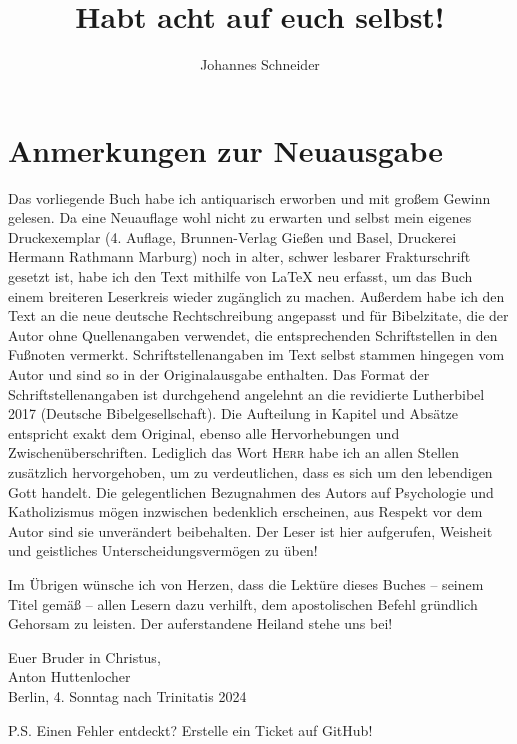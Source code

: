 \documentclass[a5paper,openany]{book}
\title{Habt acht auf euch selbst!}
\author{Johannes Schneider}
\makeatletter
\newcommand\customtitle{%
  \begin{titlepage}
    \null\vfil
    \begin{center}
      {\Huge \textbf{\@title} \par}
      \vskip 2.5em
      {\LARGE Ein brüderliches Wort an Seelsorger \par}
      \vskip 1em
      {\large von \par}
      \vskip 1em
      {\Large \@author \par}
    \end{center}\par
    \vfil\null
  \end{titlepage}
}
\makeatother
\begin{document}
\customtitle

\newpage
\thispagestyle{empty}
\section*{Anmerkungen zur Neuausgabe}
Das vorliegende Buch habe ich antiquarisch erworben und mit großem Gewinn gelesen. Da eine Neuauflage wohl nicht zu erwarten und selbst mein eigenes Druckexemplar (4. Auflage, Brunnen-Verlag Gießen und Basel, Druckerei Hermann Rathmann Marburg) noch in alter, schwer lesbarer Frakturschrift gesetzt ist, habe ich den Text mithilfe von \LaTeX{} neu erfasst, um das Buch einem breiteren Leserkreis wieder zugänglich zu machen. Außerdem habe ich den Text an die neue deutsche Rechtschreibung angepasst und für Bibelzitate, die der Autor ohne Quellenangaben verwendet, die entsprechenden Schriftstellen in den Fußnoten vermerkt. Schriftstellenangaben im Text selbst stammen hingegen vom Autor und sind so in der Originalausgabe enthalten. Das Format der Schriftstellenangaben ist durchgehend angelehnt an die revidierte Lutherbibel 2017 (Deutsche Bibelgesellschaft). Die Aufteilung in Kapitel und Absätze entspricht exakt dem Original, ebenso alle Hervorhebungen und Zwischenüberschriften. Lediglich das Wort \textsc{Herr} habe ich an allen Stellen zusätzlich hervorgehoben, um zu verdeutlichen, dass es sich um den lebendigen Gott handelt. Die gelegentlichen Bezugnahmen des Autors auf Psychologie und Katholizismus mögen inzwischen bedenklich erscheinen, aus Respekt vor dem Autor sind sie unverändert beibehalten. Der Leser ist hier aufgerufen, Weisheit und geistliches Unterscheidungsvermögen zu üben!
\par
Im Übrigen wünsche ich von Herzen, dass die Lektüre dieses Buches – seinem Titel gemäß – allen Lesern dazu verhilft, dem apostolischen Befehl gründlich Gehorsam zu leisten. Der auferstandene Heiland stehe uns bei!
\begin{flushright}
Euer Bruder in Christus,\\
Anton Huttenlocher\\
Berlin, 4. Sonntag nach Trinitatis 2024
\end{flushright}
\vspace*{\fill}
P.S. Einen Fehler entdeckt? Erstelle ein Ticket auf GitHub!
\par
\begin{flushright}
\end{flushright}
\newpage
\setcounter{page}{1}
\end{document}

